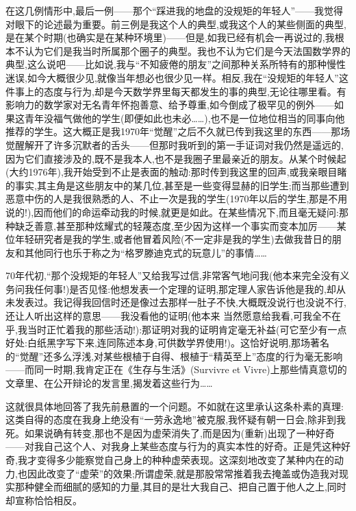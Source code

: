 在这几例情形中,最后一例——那个“踩进我的地盘的没规矩的年轻人”——我觉得对眼下的论述最为重要。前三例是我这个人的典型,或我这个人的某些侧面的典型,是在某个时期(也确实是在某种环境里)——但是,如我已经有机会一再说过的,我根本不认为它们是我当时所属那个圈子的典型。我也不认为它们是今天法国数学界的典型,这么说吧——比如说,我与“不知疲倦的朋友”之间那种关系所特有的那种慢性迷误,如今大概很少见,就像当年想必也很少见一样。相反,我在“没规矩的年轻人”这件事上的态度与行为,却是今天数学界里每天都发生的事的典型,无论往哪里看。有影响力的数学家对无名青年怀抱善意、给予尊重,如今倒成了极罕见的例外——如果这青年没福气做他的学生(即便如此也未必……),也不是一位地位相当的同事向他推荐的学生。这大概正是我1970年“觉醒”之后不久就已传到我这里的东西——那场觉醒解开了许多沉默者的舌头——但那时我听到的第一手证词对我仍然是遥远的,因为它们直接涉及的,既不是我本人,也不是我圈子里最亲近的朋友。从某个时候起(大约1976年),我开始受到不止是表面的触动:那时传到我这里的回声,或我亲眼目睹的事实,其主角是这些朋友中的某几位,甚至是一些变得显赫的旧学生;而当那些遭到恶意中伤的人是我很熟悉的人、不止一次是我的学生(1970年以后的学生,那是不用说的!),因而他们的命运牵动我的时候,就更是如此。在某些情况下,而且毫无疑问:那种缺乏善意,甚至那种炫耀式的轻蔑态度,至少因为这样一个事实而变本加厉——某位年轻研究者是我的学生,或者他冒着风险(不一定非是我的学生)去做我昔日的朋友和其他同行也乐于称之为“格罗滕迪克式的玩意儿”的事情……

70年代初,“那个没规矩的年轻人”又给我写过信,非常客气地问我(他本来完全没有义务问我任何事!)是否见怪:他想发表一个定理的证明,那定理人家告诉他是我的,却从未发表过。我记得我回信时还是像过去那样一肚子不快,大概既没说行也没说不行,还让人听出这样的意思——我没看他的证明(他本来%
当然愿意给我看,可我全不在乎,我当时正忙着我的那些活动!):那证明对我的证明肯定毫无补益(可它至少有一点好处:白纸黑字写下来,连同陈述本身,可供数学界使用!)。这恰好说明,那场著名的“觉醒”还多么浮浅,对某些根植于自得、根植于“精英至上”态度的行为毫无影响——而同一时期,我肯定正在《生存与生活》(Survivre et Vivre)上那些情真意切的文章里、在公开辩论的发言里,揭发着这些行为……

这就很具体地回答了我先前悬置的一个问题。不如就在这里承认这条朴素的真理:这类自得的态度在我身上绝没有“一劳永逸地”被克服,我怀疑有朝一日会,除非到我死。如果说确有转变,那也不是因为虚荣消失了,而是因为(重新)出现了一种好奇——对我自己这个人、对我身上某些态度与行为的真实本性的好奇。正是凭这种好奇,我才变得多少能察觉自己身上的种种虚荣表现。这深刻地改变了某种内在的动力,也因此改变了“虚荣”的效果;所谓虚荣,就是那股常常推着我去掩盖或伪造我对现实那种健全而细腻的感知的力量,其目的是壮大我自己、把自己置于他人之上,同时却宣称恰恰相反。

